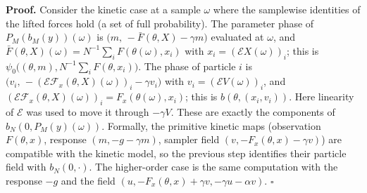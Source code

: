 \documentclass[11pt,a4paper]{report}
\begin{document}
\textbf{Proof.} Consider the kinetic case at a sample \(\omega\) where the samplewise identities of the lifted forces hold (a set of full probability). The parameter phase of \(P_M(b_M(y))(\omega)\) is \(\bigl(m,\,-\bar F(\theta,X)-\gamma m\bigr)\) evaluated at \(\omega\), and \(\bar F(\theta,X)(\omega)=N^{-1}\sum_iF(\theta(\omega),x_i)\) with \(x_i=(\mathcal EX(\omega))_i\); this is \(\psi_0\bigl((\theta,m),N^{-1}\sum_iF(\theta,x_i)\bigr)\). The phase of particle \(i\) is \(\bigl(v_i,\,-(\mathcal E\mathcal F_x(\theta,X)(\omega))_i-\gamma v_i\bigr)\) with \(v_i=(\mathcal EV(\omega))_i\), and \((\mathcal E\mathcal F_x(\theta,X)(\omega))_i=F_x(\theta(\omega),x_i)\); this is \(b(\theta,(x_i,v_i))\). Here linearity of \(\mathcal E\) was used to move it through \(-\gamma V\). These are exactly the components of \(b_N(0,P_M(y)(\omega))\). Formally, the primitive kinetic maps (observation \(F(\theta,x)\), response \((m,-g-\gamma m)\), sampler field \((v,-F_x(\theta,x)-\gamma v)\)) are compatible with the kinetic model, so the previous step identifies their particle field with \(b_N(0,\cdot)\). The higher-order case is the same computation with the response \(-g\) and the field \((u,-F_x(\theta,x)+\gamma v,-\gamma u-\alpha v)\). \(\square\)
\end{document}

